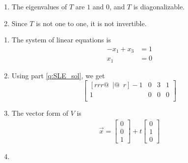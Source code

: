 \documentclass[red]{tutorial}
\newcommand{\R}{\mathbb{R}}
\newcommand{\mat}[1]{\begin{bmatrix} #1 %
\end{bmatrix}}
\newcommand{\smat}[1]{\left[\begin{smallmatrix} #1 %
\end{smallmatrix}\right]}
\theoremstyle{definition}
\theoremstyle{theorem}
\begin{document}
{\begin{solutions}
\begin{enumerate*}
\begin{enumerate}
          one-to-one because $\vec 0$ and $\smat{-1\\1}$ are both sent
          to the same point. It is not onto because $\smat{0\\1}$ is not
          in the image.
        \item The eigenvalues of $T$ are $1$ and $0$,
          and $T$ is diagonalizable.
        \item Since $T$ is not one to one, it is not invertible.
      \end{enumerate}
    \item
      \begin{enumerate}
        \item\label{q:SLE_sol}
          The system of linear equations is
          \begin{align*}
            -x_1 + x_3 &= 1\\
            x_1 \phantom{{} + x_3}&= 0
          \end{align*}
        \item Using part \ref{q:SLE_sol}, we get
          \begin{equation*}
            \begin{bmatrix}[rrr@{\enspace}|@{\enspace}r]
              -1 & 0 & 3 & 1 \\
               1 & 0 & 0 & 0 \\
            \end{bmatrix}
          \end{equation*}
        \item
          The vector form of $V$ is
          \begin{align*}
            \vec x = \mat{0\\0\\1} + t\mat{0\\1\\0}
          \end{align*}
        \item

\end{enumerate}
\end{enumerate*}
\end{solutions}}
\end{document}
